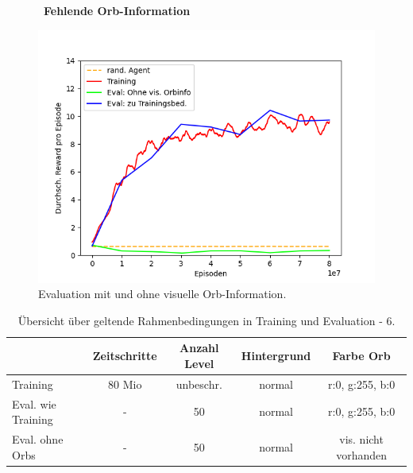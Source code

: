 \begin{figure}[htp!]
   \centering
   \captionsetup{width=0.45\linewidth} 
    \begin{minipage}{0.48\linewidth}
        \centering\
        \textbf{Fehlende Orb-Information}\par\medskip
        \includegraphics[scale=0.5]{abb/_graphen/floor_80Mio_inflvl_15act_Training_evalAsTraining_evalNoOrb}
        \caption{Evaluation mit und ohne visuelle Orb-Information.}
        \label{fig:floor_80Mio_inflvl_15act_Training_evalAsTraining_evalNoOrb}
    \end{minipage}
\end{figure}

\begin{center}
 \begin{table}[htp!]
 \begin{center}
  \begin{tabular}{ l c c c c }
    \hline
		               & Zeitschritte & Anzahl Level & Hintergrund & Farbe Orb \\ \hline \hline
     Training              & 80 Mio       & unbeschr.	  & 	    normal & r:0, g:255, b:0 \\ \hline
     Eval. wie Training & -              & 50	           & 	    normal & r:0, g:255, b:0 \\ \hline
     Eval. ohne Orbs 	& -	        	   & 50		  & 	    normal 	& vis. nicht vorhanden \\ \hline
    \hline
  \end{tabular}
  \caption{Übersicht über geltende Rahmenbedingungen in Training und Evaluation - 6.}
  \label{tab:tab_durch_EXP_trainSetting6}
  \end{center}
 \end{table}
\end{center} 


